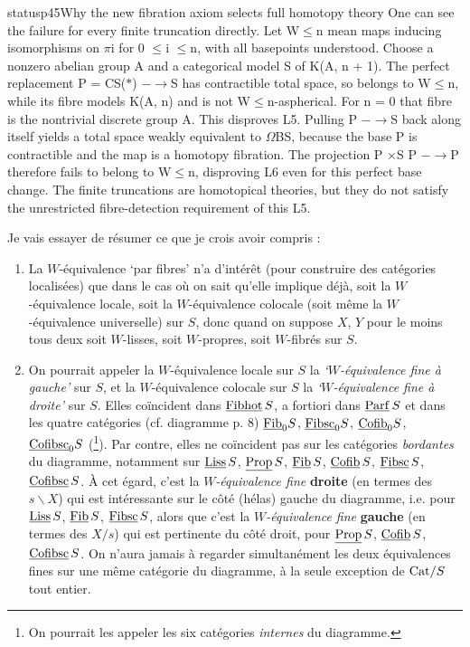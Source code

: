 \begin{dcomment}{status}{p45}{Why the new fibration axiom selects full homotopy theory}
One can see the failure for every finite truncation directly. Let W\ensuremath{\leq}n mean maps inducing isomorphisms on \ensuremath{\pi}i for 0 \ensuremath{\leq}i \ensuremath{\leq}n, with all basepoints understood. Choose a nonzero abelian group A and a categorical model S of K(A, n + 1). The perfect replacement P = CS(\ensuremath{*}) \ensuremath{-}\ensuremath{\to}S has contractible total space, so belongs to W\ensuremath{\leq}n, while its fibre models K(A, n) and is not W\ensuremath{\leq}n-aspherical. For n = 0 that fibre is the nontrivial discrete group A. This disproves L5. Pulling P \ensuremath{-}\ensuremath{\to}S back along itself yields a total space weakly equivalent to \ensuremath{\Omega}BS, because the base P is contractible and the map is a homotopy fibration. The projection P \ensuremath{\times}S P \ensuremath{-}\ensuremath{\to}P therefore fails to belong to W\ensuremath{\leq}n, disproving L6 even for this perfect base change. The finite truncations are homotopical theories, but they do not satisfy the unrestricted fibre-detection requirement of this L5.

\end{dcomment}


Je vais essayer de résumer ce que je crois avoir compris :

\begin{enumerate}[leftmargin=*]
\item[1)] La $W$-équivalence `par fibres' n'a d'intérêt (pour construire des catégories localisées) que dans le cas où on sait qu'elle implique déjà, soit la $W$-équivalence locale, soit la $W$-équivalence colocale (soit même la $W$-équivalence universelle) sur $S$, donc quand on suppose $X$, $Y$ pour le moins tous deux soit $W$-lisses, soit $W$-propres, soit $W$-fibrés sur $S$.

\item[2)] On pourrait appeler la $W$-équivalence locale sur $S$ la \textit{`$W$-équivalence fine à gauche'} sur $S$, et la $W$-équivalence colocale sur $S$ la \textit{`$W$-équivalence fine à droite'} sur $S$. Elles coïncident dans $\underline{\mathrm{Fibhot}}\,S$, a fortiori dans $\underline{\mathrm{Parf}}\,S$ et dans les quatre catégories (cf. diagramme p. 8) $\underline{\mathrm{Fib}}_0S$, $\underline{\mathrm{Fibsc}}_0S$, $\underline{\mathrm{Cofib}}_0S$, $\underline{\mathrm{Cofibsc}}_0S$ (\footnote[33]{On pourrait les appeler les six catégories \textit{internes} du diagramme.}). Par contre, elles ne coïncident pas sur les catégories \textit{bordantes} du diagramme, notamment sur $\underline{\mathrm{Liss}}\,S$, $\underline{\mathrm{Prop}}\,S$, $\underline{\mathrm{Fib}}\,S$, $\underline{\mathrm{Cofib}}\,S$, $\underline{\mathrm{Fibsc}}\,S$, $\underline{\mathrm{Cofibsc}}\,S$. À cet égard, c'est la \textit{$W$-équivalence fine} \textbf{droite} (en termes des $s\backslash X$) qui est intéressante sur le côté (hélas) gauche du diagramme, i.e. pour $\underline{\mathrm{Liss}}\,S$, $\underline{\mathrm{Fib}}\,S$, $\underline{\mathrm{Fibsc}}\,S$, alors que c'est la \textit{$W$-équivalence fine} \textbf{gauche} (en termes des $X/s$) qui est pertinente du côté droit, pour $\underline{\mathrm{Prop}}\,S$, $\underline{\mathrm{Cofib}}\,S$, $\underline{\mathrm{Cofibsc}}\,S$. On n'aura jamais à regarder simultanément les deux équivalences fines sur une même catégorie du diagramme, à la seule exception de $\mathrm{Cat}/S$ tout entier.
\end{enumerate}

